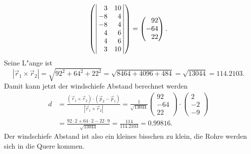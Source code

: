 \begin{loesung}
\begin{align*}
{\begin{pmatrix}
{\left|\,\begin{matrix}\phantom{-}3&          10\\         - 8&\phantom{1}4\end{matrix}\,\right|}\\
{\def\arraystretch{1.0}
\left|\,\begin{matrix}         - 8&\phantom{1}4\\\phantom{-}4&\phantom{1}6\end{matrix}\,\right|}\\
{\def\arraystretch{1.0}
\left|\,\begin{matrix}\phantom{-}4&\phantom{1}6\\\phantom{-}3&          10\end{matrix}\,\right|}
\end{pmatrix}}
=
\begin{pmatrix}
\phantom{-}92\\-64\\\phantom{-}22
\end{pmatrix}.
\end{align*}
Seine L"ange ist 
\[
|\vec{r}_1\times\vec{r}_2|
=
\sqrt{92^2+64^2+22^2}=\sqrt{8464+4096+484}=\sqrt{13044}=114.2103.
\]
Damit kann jetzt der windschiefe Abstand berechnet werden
\begin{align*}
d
&=
\frac{(\vec{r}_1\times\vec{r}_2)\cdot (\vec{p}_2 - \vec{p}_1)}{|\vec{r}_1\times \vec{r}_2|}
=
\frac1{\sqrt{13044}}
\begin{pmatrix}92\\-64\\22\end{pmatrix}
\cdot
\begin{pmatrix}2\\-2\\-9 \end{pmatrix}
\\
&=
\frac{92\cdot 2+64\cdot 2-22\cdot 9}{\sqrt{13044}}=\frac{114}{114.2103}=0.99816.
\end{align*}
Der windschiefe Abstand ist also ein kleines bisschen zu klein, die Rohre
werden sich in die Quere kommen.

\end{loesung}
